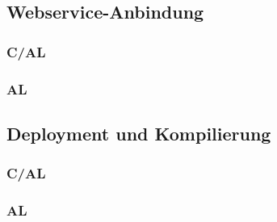 \subsection{Webservice-Anbindung}
\subsubsection{C/AL}
\subsubsection{AL}

\subsection{Deployment und Kompilierung}
\subsubsection{C/AL}
\subsubsection{AL}
















